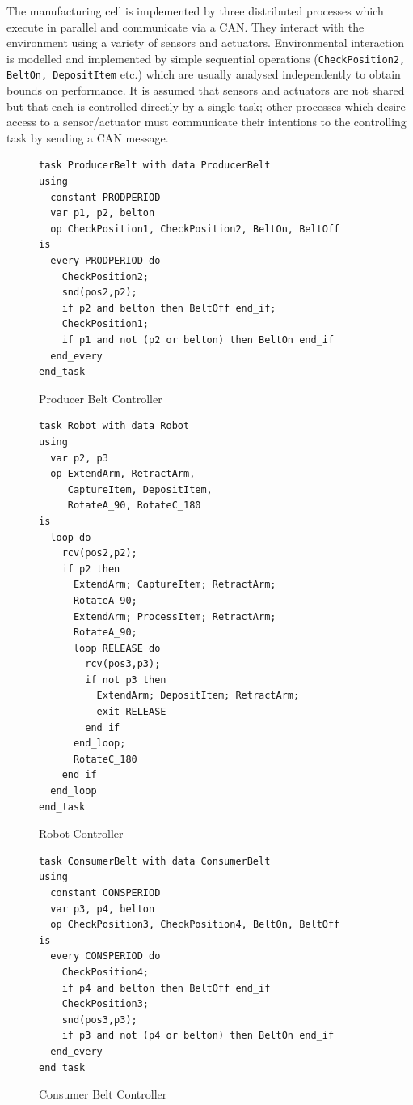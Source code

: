 The manufacturing cell is implemented by three distributed processes which execute
in parallel and communicate via a CAN. They interact with the environment using
a variety of sensors and actuators. Environmental interaction is modelled and
implemented by simple sequential operations ({\tt CheckPosition2, BeltOn,
DepositItem} etc.) which are usually analysed independently to obtain
bounds on performance. It is assumed that sensors and actuators are  
not shared but that each is controlled directly by a single task; other processes
which desire access to a sensor/actuator must communicate their intentions
to the controlling task by sending a CAN message.
 
\begin{figure}
\scriptsize
\begin{verbatim}
task ProducerBelt with data ProducerBelt
using
  constant PRODPERIOD
  var p1, p2, belton
  op CheckPosition1, CheckPosition2, BeltOn, BeltOff
is
  every PRODPERIOD do
    CheckPosition2;
    snd(pos2,p2);
    if p2 and belton then BeltOff end_if;
    CheckPosition1;
    if p1 and not (p2 or belton) then BeltOn end_if
  end_every
end_task
\end{verbatim}
\caption{Producer Belt Controller \label{fig:pbc}}
\end{figure}

\begin{figure}
\scriptsize
\begin{verbatim}
task Robot with data Robot
using
  var p2, p3 
  op ExtendArm, RetractArm, 
     CaptureItem, DepositItem,
     RotateA_90, RotateC_180
is
  loop do
    rcv(pos2,p2);
    if p2 then
      ExtendArm; CaptureItem; RetractArm;
      RotateA_90;
      ExtendArm; ProcessItem; RetractArm;
      RotateA_90;
      loop RELEASE do
        rcv(pos3,p3);
        if not p3 then
          ExtendArm; DepositItem; RetractArm;
          exit RELEASE
        end_if
      end_loop;
      RotateC_180
    end_if
  end_loop
end_task   
\end{verbatim}
\caption{Robot Controller\label{fig:rc}}
\end{figure}


\begin{figure}
\scriptsize
\begin{verbatim}
task ConsumerBelt with data ConsumerBelt
using
  constant CONSPERIOD 
  var p3, p4, belton
  op CheckPosition3, CheckPosition4, BeltOn, BeltOff
is  
  every CONSPERIOD do
    CheckPosition4;
    if p4 and belton then BeltOff end_if
    CheckPosition3;
    snd(pos3,p3);
    if p3 and not (p4 or belton) then BeltOn end_if
  end_every
end_task 
\end{verbatim}
\caption{Consumer Belt Controller\label{fig:cbc}}
\end{figure}

